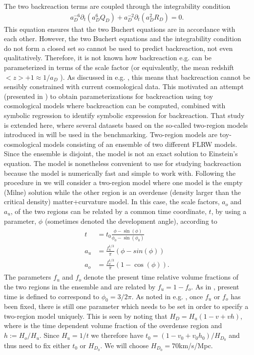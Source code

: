 \documentclass[a4paper,11pt]{article}
\begin{document}
	The two backreaction terms are coupled through the integrability condition
	\begin{align}
	    a_D^{-6}\partial_t(a_D^6Q_D) + a_D^{-2}\partial_t(a_D^2R_D) = 0.
	\end{align}
	This equation ensures that the two Buchert equations are in accordance with each other. However, the two Buchert equations and the integrability condition do not form a closed set so cannot be used to predict backreaction, not even qualitatively. Therefore, it is not known how backreaction e.g. can be parameterized in terms of the scale factor (or equivalently, the mean redshift $<z>+1\approx 1/a_D$ \cite{light1, light2}). As discussed in e.g. \cite{zdrift1,zdrift2}, this means that backreaction cannot be sensibly constrained with current cosmological data. This motivated an attempt (presented in \cite{zdrift1,zdrift2}) to obtain parameterizations for backreaction using toy cosmological models where backreaction can be computed, combined with symbolic regression to identify symbolic expression for backreaction. That study is extended here, where several datasets based on the so-called two-region models introduced in \cite{2region1, 2region2} will be used in the benchmarking.
	\newline\newline
	Two-region models are toy-cosmological models consisting of an ensemble of two different FLRW models. Since the ensemble is disjoint, the model is not an exact solution to Einstein's equation. The model is nonetheless convenient to use for studying backreaction because the model is numerically fast and simple to work with. Following the procedure in \cite{2region1, 2region2} we will consider a two-region model where one model is the empty (Milne) solution while the other region is an overdense (density larger than the critical density) matter+curvature model. In this case, the scale factors, $a_o$ and $a_u$, of the two regions can be related by a common time coordinate, $t$, by using a parameter, $\phi$ (sometimes denoted the development angle), according to
	\begin{align}
	\begin{split}
	    t &= t_0\frac{\phi - \sin(\phi)}{\phi_0 - \sin(\phi_0)}\\
	    a_u & = \frac{f_u^{1/3}}{\pi}(\phi - sin(\phi))\\
	    a_o & = \frac{f_o^{1/3}}{\pi}(1-\cos(\phi) ).
	\end{split}
	\end{align}
	The parameters $f_u$ and $f_o$ denote the present time relative volume fractions of the two regions in the ensemble and are related by $f_u = 1-f_o$. As in \cite{2region1,2region2}, present time is defined to correspond to $\phi_0 = 3/2\pi$. As noted in e.g. \cite{zdrift2}, once $f_u$ or $f_o$ has been fixed, there is still one parameter which needs to be set in order to specify a two-region model uniquely. This is seen by noting that $H_D = H_u(1-v + vh)$, where is the time dependent volume fraction of the overdense region and $h:=H_o/H_u$. Since $H_u=1/t$ we therefore have $t_0=(1-v_0+v_0h_0)/H_{D_0}$ and thus need to fix either $t_0$ or $H_{D_0}$. We will choose $H_{D_0} = 70$km/s/Mpc.
\end{document}
